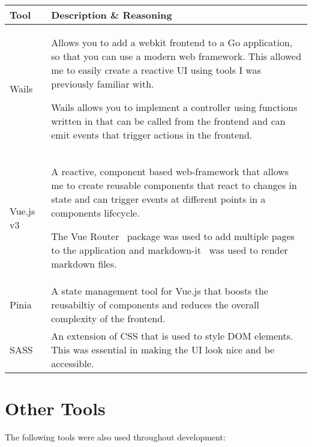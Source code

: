 \begin{longtable}{p{} p{}}
  \toprule
  \textbf{Tool} & \textbf{Description \& Reasoning}
  \\\midrule\midrule
  Wails~\cite{noauthor_wails_nodate}
  & Allows you to add a webkit frontend to a Go application, so that you can use a modern web framework. This allowed me to easily create a reactive UI using tools I was previously familiar with.

  Wails allows you to implement a controller using functions written in that can be called from the frontend and can emit events that trigger actions in the frontend.
  \\
  Vue.js v3~\cite{noauthor_vuejs_nodate}
  & A reactive, component based web-framework that allows me to create reusable components that react to changes in state and can trigger events at different points in a components lifecycle.
  
  The Vue Router~\cite{noauthor_vue_nodate} package was used to add multiple pages to the application and markdown-it~\cite{noauthor_markdown-it_2023} was used to render markdown files.
  \\
  Pinia~\cite{noauthor_pinia_nodate}
  & A state management tool for Vue.js that boosts the reusabiltiy of components and reduces the overall complexity of the frontend. 
  \\
  SASS~\cite{noauthor_sass_nodate}
  & An extension of CSS that is used to style DOM elements. This was essential in making the UI look nice and be accessible.
  \\
  \bottomrule\bottomrule
\end{longtable}

\section{Other Tools}

The following tools were also used throughout development:

